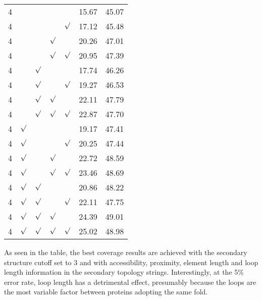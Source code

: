 \documentclass{article}
\newcommand{\tick}{\mbox{$\surd$}}
\begin{document}
\begin{table}
\begin{tabularx}{\linewidth}{lllllXX}
4         &               &           &         &        & 15.67     & 45.07     \\
4         &               &           &         & \tick  & 17.12     & 45.48     \\
4         &               &           & \tick   &        & 20.26     & 47.01     \\
4         &               &           & \tick   & \tick  & 20.95     & 47.39     \\
4         &               & \tick     &         &        & 17.74     & 46.26     \\
4         &               & \tick     &         & \tick  & 19.27     & 46.53     \\
4         &               & \tick     & \tick   &        & 22.11     & 47.79     \\
4         &               & \tick     & \tick   & \tick  & 22.87     & 47.70     \\
4         & \tick         &           &         &        & 19.17     & 47.41     \\
4         & \tick         &           &         & \tick  & 20.25     & 47.44     \\
4         & \tick         &           & \tick   &        & 22.72     & 48.59     \\
4         & \tick         &           & \tick   & \tick  & 23.46     & 48.69     \\
4         & \tick         & \tick     &         &        & 20.86     & 48.22     \\
4         & \tick         & \tick     &         & \tick  & 22.11     & 47.75     \\
4         & \tick         & \tick     & \tick   &        & 24.39     & 49.01     \\
4         & \tick         & \tick     & \tick   & \tick  & 25.02     & 48.98     \\
\hline
\end{tabularx}
\end{table}

As seen in the table, the best coverage results are achieved with the
secondary structure cutoff set to 3 and with accessibility, proximity,
element length and loop length information in the secondary topology
strings.  Interestingly, at the 5\% error rate, loop length has a
detrimental effect, presumably because the loops are the most variable
factor between proteins adopting the same fold.
\end{document}
